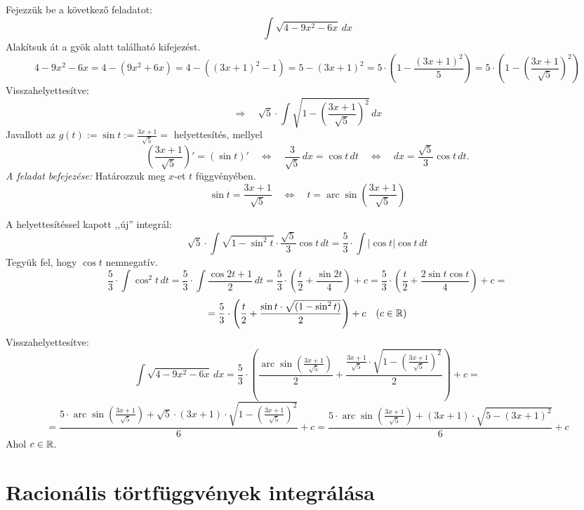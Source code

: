 \documentclass[a4paper,11.5pt]{article}
\DeclareMathOperator{\arc}{arc}
\begin{document}
	\begin{exercise}
		Fejezzük be a következő feladatot:
		\[ \int\sqrt{4-9x^2-6x}\,dx%
		\]
		Alakítsuk át a gyök alatt található kifejezést.
		\[ 4-9x^2-6x=4-(9x^2+6x)=4-((3x+1)^2-1)=5-(3x+1)^2=5\cdot\left(1-\frac{(3x+1)^2}{5}\right)=5\cdot\left(1-\left(\frac{3x+1}{\sqrt{5}}\right)^2\right)\]
		Visszahelyettesítve:
		\[\Rightarrow\quad \sqrt{5}\cdot\int\sqrt{1-\left(\frac{3x+1}{\sqrt{5}}\right)^2}\,dx \]
		Javallott az $\displaystyle g(t):=\sin t:=\frac{3x+1}{\sqrt{5}}=$ helyettesítés, mellyel
		\[ \left(\frac{3x+1}{\sqrt{5}}\right)'=(\sin t)'\quad  \Leftrightarrow\quad \frac{3}{\sqrt{5}}\,dx=\cos t\,dt\quad \Leftrightarrow\quad dx=\frac{\sqrt{5}}{3}\cos t\,dt. \]
		\textit{A feladat befejezése:}	Határozzuk meg $x$-et $t$ függvényében.
		\[ \sin t=\frac{3x+1}{\sqrt 5}\quad \Leftrightarrow\quad t = \arc\sin\left(\frac{3x+1}{\sqrt{5}}\right) \]
		
		A helyettesítéssel kapott ,,új'' integrál:
		\[ \sqrt{5}\cdot\int\sqrt{1-\sin^2t}\cdot\frac{\sqrt{5}}{3}\cos t\,dt=\frac{5}{3}\cdot\int|\cos t|\cos t\,dt\]
		Tegyük fel, hogy $\cos t$ nemnegatív.
		\[ \frac{5}{3}\cdot\int\cos^2 t\,dt=\frac{5}{3}\cdot\int\frac{\cos2t+1}{2}\,dt=\frac{5}{3}\cdot\left(\frac{t}{2}+\frac{\sin2t}{4}\right)+c=\frac{5}{3}\cdot\left(\frac{t}{2}+\frac{2\sin t\cos t}{4}\right)+c= \]
		\[ =\frac{5}{3}\cdot\left(\frac{t}{2}+\frac{\sin t\cdot\sqrt{(1-\sin^2t)}}{2}\right)+c \quad (c\in\mathbb{R})\]
		Visszahelyettesítve:
		\[ \int\sqrt{4-9x^2-6x}\,dx=\frac{5}{3}\cdot\left(\frac{\arc\sin\left(\frac{3x+1}{\sqrt 5}\right)}{2}+\frac{\frac{3x+1}{\sqrt{5}}\cdot\sqrt{1-\left(\frac{3x+1}{\sqrt{5}}\right)^2}}{2}\right)+c=\]
		\[ =\frac{5\cdot\arc\sin\left(\frac{3x+1}{\sqrt 5}\right)+\sqrt{5}\cdot(3x+1)\cdot\sqrt{1-\left(\frac{3x+1}{\sqrt{5}}\right)^2}}{6}+c=\frac{5\cdot\arc\sin\left(\frac{3x+1}{\sqrt 5}\right)+(3x+1)\cdot\sqrt{5-(3x+1)^2}}{6}+c \]
		Ahol $c\in\mathbb{R}$.
	\end{exercise}
	\section{Racionális törtfüggvények integrálása}
\end{document}

